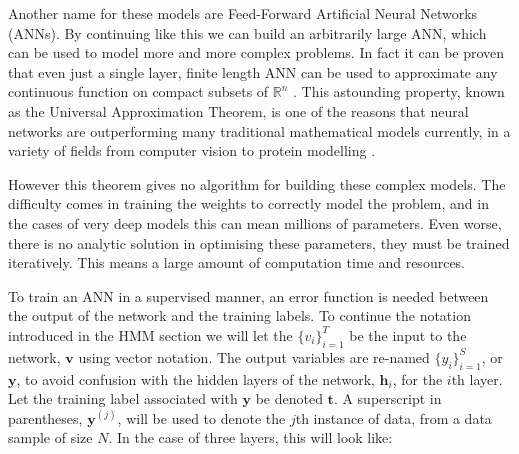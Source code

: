 \documentclass[bsc,singlespacing,logo, parskip, deptreport]{infthesis}
\begin{document}
\begin{center}
\end{center}

Another name for these models are Feed-Forward Artificial Neural Networks (ANNs). By continuing like this we can build an arbitrarily large ANN, which can be used to model more and more complex problems. In fact it can be proven that even just a single layer, finite length ANN can be used to approximate any continuous function on compact subsets of ${\mathbb R}^n$ \cite{cybenko1989approximation}\cite{hornik1989multilayer}. This astounding property, known as the Universal Approximation Theorem, is one of the reasons that neural networks are outperforming many traditional mathematical models currently, in a variety of fields from computer vision \cite{krizhevsky2012imagenet} to protein modelling \cite{uziela2017proq3d}.

However this theorem gives no algorithm for building these complex models. The difficulty comes in training the weights to correctly model the problem, and in the cases of very deep models this can mean millions of parameters. Even worse, there is no analytic solution in optimising these parameters, they must be trained iteratively. This means a large amount of computation time and resources.

To train an ANN in a supervised manner, an error function is needed between the output of the network and the training labels. To continue the notation introduced in the HMM section we will let the $\{v_i\}_{i=1}^{T}$ be the input to the network, $\bm{v}$ using vector notation. The output variables are re-named $\{y_i\}_{i=1}^{S}$, or $\bm{y}$, to avoid confusion with the hidden layers of the network, $\bm{h}_i$, for the $i$th layer. Let the training label associated with $\bm{y}$ be denoted $\bm{t}$. A superscript in parentheses, $\bm{y}^{(j)}$, will be used to denote the $j$th instance of data, from a data sample of size $N$. In the case of three layers, this will look like:
\end{document}
